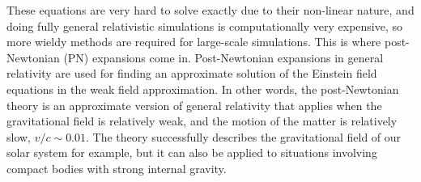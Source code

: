 \documentclass[english, oneside]{HYgradu}
\begin{document}
These equations are very hard to solve exactly due to their non-linear nature, and doing fully general relativistic simulations is computationally very expensive, so more wieldy methods are required for large-scale simulations. This is where post-Newtonian (PN) expansions come in. Post-Newtonian expansions in general relativity are used for finding an approximate solution of the Einstein field equations in the weak field approximation.
In other words, the post-Newtonian theory is an approximate version of general relativity that applies when the gravitational field is relatively weak, and the motion of the matter is relatively slow, $v/c \sim 0.01$. The theory successfully describes the gravitational field of our solar system for example, but it can also be applied to situations involving compact bodies with strong internal gravity.
%
%
\end{document}
